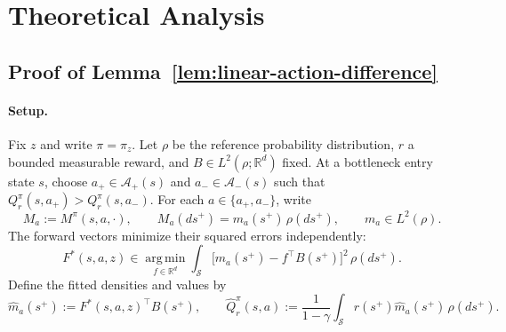 \section{Theoretical Analysis}
\label{app:dfb-theory}
\label{app:theory}
\label{app:bottleneck-proof}

\subsection{Proof of Lemma~\ref{lem:linear-action-difference}}

\paragraph{Setup.}
Fix $z$ and write $\pi=\pi_z$.
Let $\rho$ be the reference probability distribution, $r$ a bounded measurable reward, and $B\in L^2(\rho;\mathbb R^d)$ fixed. 
At a bottleneck entry state $s$, choose $a_+\in\mathcal A_+(s)$ and $a_-\in\mathcal A_-(s)$ such that $Q_r^\pi(s,a_+)>Q_r^\pi(s,a_-)$.
For each $a\in\{a_+,a_-\}$, write
\[
    M_a:=M^\pi(s,a,\cdot),
    \qquad
    M_a(ds^+)=m_a(s^+)\,\rho(ds^+),
    \qquad
    m_a\in L^2(\rho).
\]
The forward vectors minimize their squared errors independently:
\[
    F^*(s,a,z)
    \in\operatorname*{arg\,min}_{f\in\mathbb R^d}
    \int_{\mathcal S}
    \bigl[m_a(s^+)-f^\top B(s^+)\bigr]^2\,\rho(ds^+).
\]
Define the fitted densities and values by
\[
    \widehat m_a(s^+):=F^*(s,a,z)^\top B(s^+),
    \qquad
    \widehat Q_r^\pi(s,a)
    :=\frac{1}{1-\gamma}
    \int_{\mathcal S}r(s^+)\widehat m_a(s^+)\,\rho(ds^+).
\]

